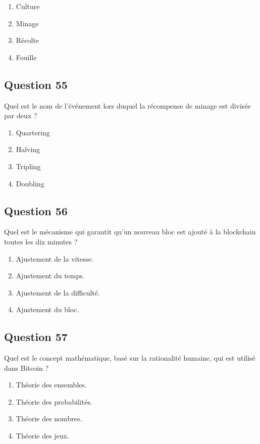 \documentclass[12pt,a4paper]{article}
\begin{document}
\begin{enumerate}[label=\Alph*., leftmargin=*]
\item Culture
\item Minage
\item Récolte
\item Fouille
\end{enumerate}

\bigskip


\subsection*{Question 55}
Quel est le nom de l'événement lors duquel la récompense de minage est divisée par deux ?

\begin{enumerate}[label=\Alph*., leftmargin=*]
\item Quartering
\item Halving
\item Tripling
\item Doubling
\end{enumerate}

\bigskip


\subsection*{Question 56}
Quel est le mécanisme qui garantit qu'un nouveau bloc est ajouté à la blockchain toutes les dix minutes ?

\begin{enumerate}[label=\Alph*., leftmargin=*]
\item Ajustement de la vitesse.
\item Ajustement du temps.
\item Ajustement de la difficulté.
\item Ajustement du bloc.
\end{enumerate}

\bigskip


\subsection*{Question 57}
Quel est le concept mathématique, basé sur la rationalité humaine, qui est utilisé dans Bitcoin ?

\begin{enumerate}[label=\Alph*., leftmargin=*]
\item Théorie des ensembles.
\item Théorie des probabilités.
\item Théorie des nombres.
\item Théorie des jeux.
\end{enumerate}
\end{document}
